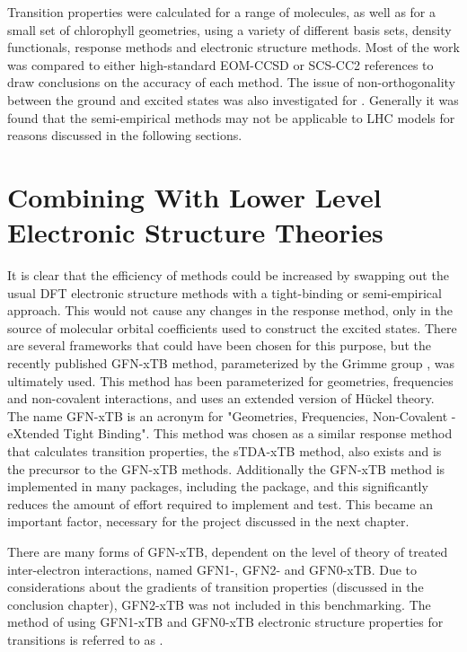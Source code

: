 Transition properties were calculated for a range of molecules, as well as
for a small set of chlorophyll geometries, using a variety of different basis sets,
density functionals, response methods and electronic structure methods. Most of 
the work was compared to either high-standard EOM-CCSD or SCS-CC2 references to
draw conclusions on the accuracy of each method. The issue of non-orthogonality 
between the ground and excited states was also investigated for \dscf. Generally
it was found that the semi-empirical \dscf methods may not be applicable to LHC
models for reasons discussed in the following sections.

\section{Combining \dscf With Lower Level Electronic Structure Theories}
\label{sec:dscf_theory}
It is clear that the efficiency of \dscf methods could be increased by swapping out
the usual DFT electronic structure methods with a tight-binding or semi-empirical approach.
This would not cause any changes in the response method, only in the source of molecular
orbital coefficients used to construct the excited states. There are several frameworks 
that could have been chosen for this purpose, but the recently published GFN-xTB
method, parameterized by the Grimme group \cite{Grimme2017}, was ultimately used.
This method has been parameterized for geometries, frequencies and non-covalent 
interactions, and uses an extended version of H{\"u}ckel theory. The name GFN-xTB
is an acronym for "Geometries, Frequencies, Non-Covalent - eXtended Tight Binding".
This method was chosen as a similar response method that calculates transition 
properties, the sTDA-xTB method, also exists and is the precursor to the GFN-xTB methods.
Additionally the GFN-xTB method is implemented in many packages, including the 
package, and this significantly reduces the amount of effort required to implement 
and test. This became an important factor, necessary for the project discussed in
the next chapter.

There are many forms of GFN-xTB, dependent on the level of theory of treated inter-electron
interactions, named GFN1-, GFN2- and GFN0-xTB. Due to considerations about the gradients 
of transition properties (discussed in the conclusion chapter), GFN2-xTB was not
included in this benchmarking. The method of using GFN1-xTB and GFN0-xTB electronic 
structure properties for \dscf transitions is referred to as \dxtb.

